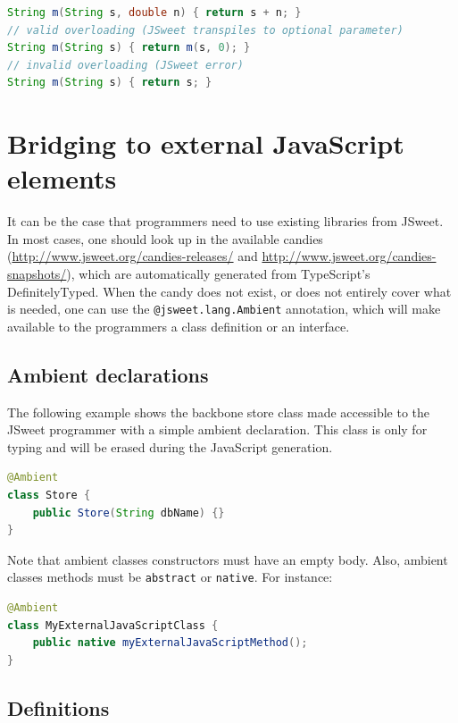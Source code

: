 \documentclass[a4paper]{report}
\begin{document}
\begin{lstlisting}[language=Java]
String m(String s, double n) { return s + n; }
// valid overloading (JSweet transpiles to optional parameter)
String m(String s) { return m(s, 0); }
// invalid overloading (JSweet error)
String m(String s) { return s; }
\end{lstlisting}

\chapter{Bridging to external JavaScript elements}

It can be the case that programmers need to use existing libraries from JSweet. In most cases, one should look up in the available candies (\url{http://www.jsweet.org/candies-releases/} and \url{http://www.jsweet.org/candies-snapshots/}), which are automatically generated from TypeScript's DefinitelyTyped. When the candy does not exist, or does not entirely cover what is needed, one can use the \texttt{@jsweet.lang.Ambient} annotation, which will make available to the programmers a class definition or an interface. 

\section{Ambient declarations}

The following example shows the backbone store class made accessible to the JSweet programmer with a simple ambient declaration. This class is only for typing and will be erased during the JavaScript generation.

\begin{lstlisting}[language=Java]
@Ambient
class Store {
	public Store(String dbName) {}
}
\end{lstlisting}

Note that ambient classes constructors must have an empty body. Also, ambient classes methods must be \texttt{abstract} or \texttt{native}. For instance:

\begin{lstlisting}[language=Java]
@Ambient
class MyExternalJavaScriptClass {
	public native myExternalJavaScriptMethod();
}
\end{lstlisting}

\section{Definitions}
\end{document}
